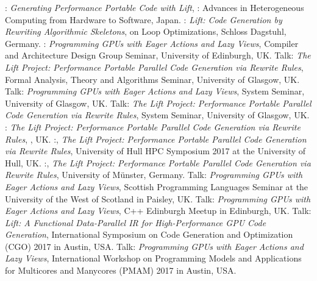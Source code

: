          {:
          \emph{Generating Performance Portable Code with Lift},
         \small {}: Advances in Heterogeneous Computing from Hardware to Software, Japan.}
         {:
          \emph{Lift: Code Generation by Rewriting Algorithmic Skeletons},
         \small {} on Loop Optimizations, Schloss Dagstuhl, Germany.}
         {:
          \emph{Programming GPUs with Eager Actions and Lazy Views},
         \small Compiler and Architecture Design Group Seminar, University of Edinburgh, UK.}
         {Talk: \emph{The Lift Project: Performance Portable Parallel Code Generation via Rewrite Rules},
         \small Formal Analysis, Theory and Algorithms Seminar, University of Glasgow, UK.}
         {Talk: \emph{Programming GPUs with Eager Actions and Lazy Views},
         \small System Seminar, University of Glasgow, UK.}
         {Talk: \emph{The Lift Project: Performance Portable Parallel Code Generation via Rewrite Rules},
         \small System Seminar, University of Glasgow, UK.}
         {:
          \emph{The Lift Project: Performance Portable Parallel Code Generation via Rewrite Rules},
         \small {}, UK.}
         {:,
          \emph{The Lift Project: Performance Portable Parallel Code Generation via Rewrite Rules},
         \small University of Hull HPC Symposium 2017 at the University of Hull, UK.}
         {:,
          \emph{The Lift Project: Performance Portable Parallel Code Generation via Rewrite Rules},
         \small University of Münster, Germany.}
         {Talk: \emph{Programming GPUs with Eager Actions and Lazy Views},
         \small Scottish Programming Languages Seminar at the University of the West of Scotland in Paisley, UK.}
         {Talk: \emph{Programming GPUs with Eager Actions and Lazy Views},
         \small C++ Edinburgh Meetup in Edinburgh, UK.}
         {Talk: \emph{Lift: A Functional Data-Parallel IR for High-Performance GPU Code Generation},
          \small International Symposium on Code Generation and Optimization (CGO) 2017 in Austin, USA.}
         {Talk: \emph{Programming GPUs with Eager Actions and Lazy Views},
          \small  International Workshop on Programming Models and Applications for Multicores and Manycores (PMAM) 2017 in Austin, USA.}
